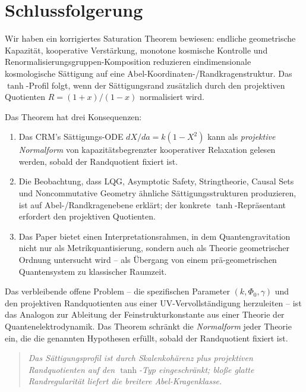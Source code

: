 \documentclass[aps,prd,twocolumn,superscriptaddress,nofootinbib]{revtex4-2}
\begin{document}
\section{Schlussfolgerung}
\label{sec:conclusion}

Wir haben ein korrigiertes Saturation Theorem bewiesen: endliche geometrische Kapazität, kooperative Verstärkung, monotone kosmische Kontrolle und Renormalisierungsgruppen-Komposition reduzieren eindimensionale kosmologische Sättigung auf eine Abel-Koordinaten-/Randkragenstruktur. Das $\tanh$-Profil folgt, wenn der Sättigungsrand zusätzlich durch den projektiven Quotienten $R=(1+x)/(1-x)$ normalisiert wird.

Das Theorem hat drei Konsequenzen:

\begin{enumerate}
\item Das CRM's Sättigungs-ODE $dX/da = k(1-X^2)$ kann als \textit{projektive Normalform} von kapazitätsbegrenzter kooperativer Relaxation gelesen werden, sobald der Randquotient fixiert ist.

\item Die Beobachtung, dass LQG, Asymptotic Safety, Stringtheorie, Causal Sets und Noncommutative Geometry ähnliche Sättigungsstrukturen produzieren, ist auf Abel-/Randkragenebene erklärt; der konkrete $\tanh$-Repräsentant erfordert den projektiven Quotienten.

\item Das Paper bietet einen Interpretationsrahmen, in dem Quantengravitation nicht nur als Metrikquantisierung, sondern auch als Theorie geometrischer Ordnung untersucht wird -- als Übergang von einem prä-geometrischen Quantensystem zu klassischer Raumzeit.
\end{enumerate}

Das verbleibende offene Problem -- die spezifischen Parameter $(k, \Phi_0, \gamma)$ und den projektiven Randquotienten aus einer UV-Vervollständigung herzuleiten -- ist das Analogon zur Ableitung der Feinstrukturkonstante aus einer Theorie der Quantenelektrodynamik. Das Theorem schränkt die \textit{Normalform} jeder Theorie ein, die die genannten Hypothesen erfüllt, sobald der Randquotient fixiert ist.

\begin{quote}
\textit{Das Sättigungsprofil ist durch Skalenkohärenz plus projektiven Randquotienten auf den $\tanh$-Typ eingeschränkt; bloße glatte Randregularität liefert die breitere Abel-Kragenklasse.}
\end{quote}
\end{document}
